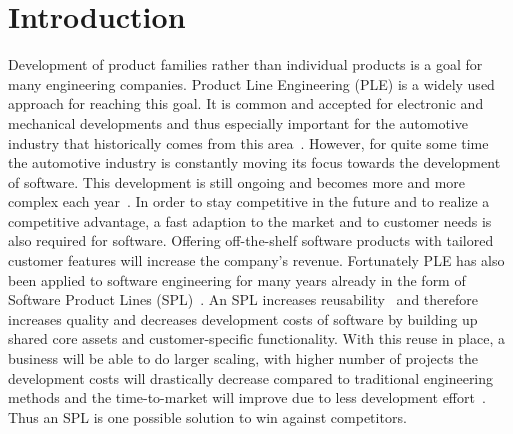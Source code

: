 \section{Introduction}

Development of product families rather than individual products is a goal for
many engineering companies. Product Line Engineering (PLE) is a widely used
approach for reaching this goal. It is common and accepted for electronic and
mechanical developments and thus especially important for the automotive
industry that historically comes from this area~\cite{bookssp19X19}. However,
for quite some time the automotive industry is constantly moving its focus
towards the development of software. This development is still ongoing and
becomes more and more complex each year~\cite{ICSE03498}. In order to stay
competitive in the future and to realize a competitive advantage, a fast
adaption to the market and to customer needs is also required for software.
Offering off-the-shelf software products with tailored customer features will
increase the company's revenue. Fortunately PLE has also been applied to
software engineering for many years already in the form of Software Product
Lines (SPL)~\cite{confsplc2000}. An SPL increases reusability~\cite{Clem02a} and
therefore increases quality and decreases development costs of software by
building up shared core assets and customer-specific functionality. With this
reuse in place, a business will be able to do larger scaling, with higher number
of projects the development costs will drastically decrease compared to
traditional engineering methods and the time-to-market will improve due to less
development effort~\cite{confsplcAzanzaMD21}. Thus an SPL is one possible
solution to win against competitors.

